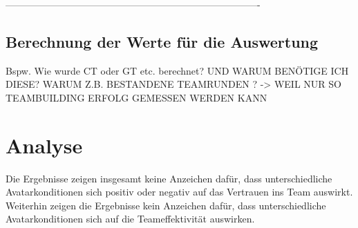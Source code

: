 \documentclass[a4paper,11pt]{article}%
\renewcommand{\\}{\vspace*{0.5\baselineskip} \newline}
\begin{document}
%



%
%
%
%
%
%	

-------------------------------------------------------------------------------



\subsection{Berechnung der Werte für die Auswertung}
Bspw. Wie wurde CT oder GT etc. berechnet? UND WARUM BENÖTIGE ICH DIESE? WARUM Z.B. BESTANDENE TEAMRUNDEN ? -> WEIL NUR SO TEAMBUILDING ERFOLG GEMESSEN WERDEN KANN
\newpage

\clearpage
\newpage
\section{Analyse}
Die Ergebnisse zeigen insgesamt keine Anzeichen dafür, dass unterschiedliche Avatarkonditionen sich positiv oder negativ auf das Vertrauen ins Team auswirkt. Weiterhin zeigen die Ergebnisse kein Anzeichen dafür, dass unterschiedliche Avatarkonditionen sich auf die Teameffektivität auswirken.
\end{document}

